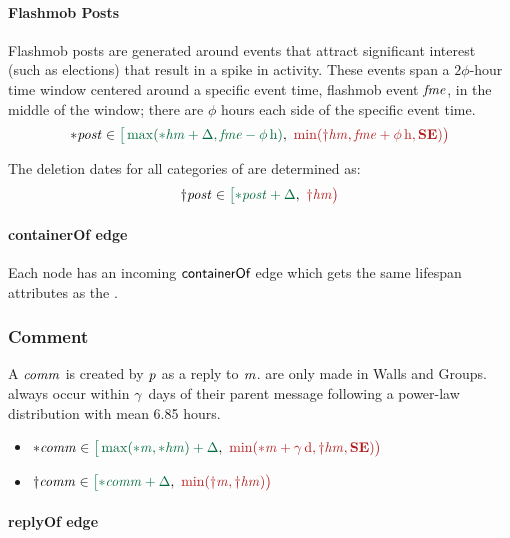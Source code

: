 \paragraph{Flashmob Posts}

Flashmob posts are generated around events that attract significant interest
(such as elections) that result in a spike in activity.
These events span a $2\phi$-hour time window centered around a specific event time, flashmob event $\mathit{fme}$, in the middle of the window; there are $\phi$ hours each side of the specific event time.
$$
\varc{\ePost} \in \interval{\max(\varc{\eHasMember} + \Delta,\eFlashmobEvent - \phi\textrm{\,h})}{\min (\vard{\eHasMember},\eFlashmobEvent + \phi\textrm{\,h},\xSE)}
$$

The deletion dates for all categories of \tPosts are determined as:
$$\vard{\ePost} \in \interval{\varc{\ePost} + \Delta}{\vard{\eHasMember}}$$

\paragraph{containerOf edge}

Each \tPost node has an incoming $\textsf{containerOf}$ edge which gets the same lifespan attributes as the \tPost.

\subsubsection{Comment}

A \tComment $\mathit{comm}$ is created by \tPerson $\mathit{p}$ as a reply to \tMessage $\mathit{m}$. \tComments are only made in Walls and Groups. \tComment always occur within $\gamma$~days of their parent message following a power-law distribution with mean 6.85 hours.

\begin{itemize}
    \item $\varc{\eComment} \in \interval{\max (\varc{\eMessage}, \varc{\eHasMember}) + \Delta}{\min (\varc{\eMessage} + \gamma\textrm{\,d}, \vard{\eHasMember}, \xSE)}$
    \item $\vard{\eComment} \in \interval{\varc{\eComment} + \Delta}{\min (\vard{\eMessage}, \vard{\eHasMember})}$
\end{itemize}

\paragraph{replyOf edge}

